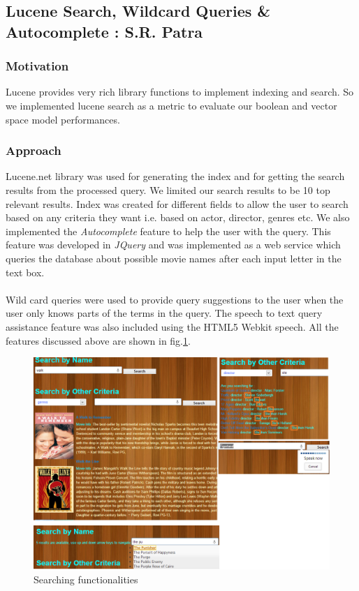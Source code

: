 \subsection{Lucene Search, Wildcard Queries \& Autocomplete : S.R. Patra}
\subsubsection{Motivation}
Lucene provides very rich library functions to implement indexing and search. So we implemented lucene search as a metric to evaluate our boolean and vector space model performances. 
\subsubsection{Approach}
Lucene.net library was used for generating the index and for getting the search results from the processed query. We limited our search results to be 10 top relevant results. Index was created for different fields to allow the user to search based on any criteria they want i.e. based on actor, director, genres etc. We also implemented the \textit{Autocomplete} feature to help the user with the query. This feature was developed in \textit{JQuery} and was implemented as a web service which queries the database about possible movie names after each input letter in the text box. 

\paragraph{}
Wild card queries were used to provide query suggestions to the user when the user only knows parts of the terms in the query. The speech to text query assistance feature was also included using the HTML5 Webkit speech. All the features discussed above are shown in fig.\ref{fig:search}.
\begin{figure}[H]
    \centering
    \includegraphics[width=4.5in]{search.png}
    \caption{Searching functionalities}
    \label{fig:search}
\end{figure}

